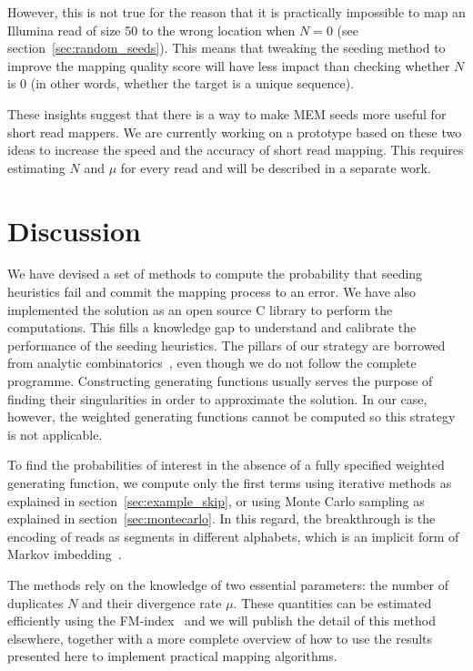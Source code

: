 \documentclass{article}
\begin{document}
However, this is not true for the reason that it is practically impossible
to map an Illumina read of size 50 to the wrong location when $N=0$ (see
section~\ref{sec:random_seeds}). This means that tweaking the seeding
method to improve the mapping quality score will have less impact than
checking whether $N$ is 0 (in other words, whether the target is a unique
sequence).

These insights suggest that there is a way to make MEM seeds more useful
for short read mappers. We are currently working on a prototype based on
these two ideas to increase the speed and the accuracy of short read
mapping. This requires estimating $N$ and $\mu$ for every read and will be
described in a separate work.


\section{Discussion}
\label{sec_disc}

We have devised a set of methods to compute the probability that seeding
heuristics fail and commit the mapping process to an error. We have also
implemented the solution as an open source C library to perform the
computations. This fills a knowledge gap to understand and calibrate the
performance of the seeding heuristics. The pillars of our strategy are
borrowed from analytic combinatorics~\cite{flajolet2009analytic,
sedgewick2013introduction}, even though we do not follow the complete
programme. Constructing generating functions usually serves the purpose of
finding their singularities in order to approximate the solution. In our
case, however, the weighted generating functions cannot be computed so
this strategy is not applicable.

To find the probabilities of interest in the absence of a fully specified
weighted generating function, we compute only the first terms using
iterative methods as explained in section~\ref{sec:example_skip}, or using
Monte Carlo sampling as explained in section~\ref{sec:montecarlo}. In this
regard, the breakthrough is the encoding of reads as segments in different
alphabets, which is an implicit form of Markov
imbedding~\cite{fu1994distribution}.

The methods rely on the knowledge of two essential parameters: the number
of duplicates $N$ and their divergence rate $\mu$. These quantities can be
estimated efficiently using the FM-index~\cite{ferragina2005indexing} and
we will publish the detail of this method elsewhere, together with a more
complete overview of how to use the results presented here to implement
practical mapping algorithms.
\end{document}
